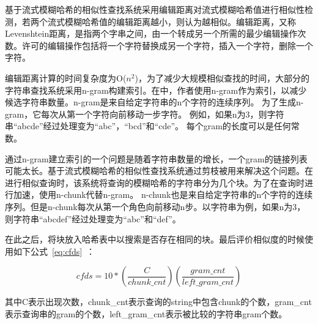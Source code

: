 基于流式模糊哈希的相似性查找系统采用编辑距离对流式模糊哈希值进行相似性检测，若两个流式模糊哈希值的编辑距离越小，则认为越相似。编辑距离，又称Levenshtein距离，是指两个字串之间，由一个转成另一个所需的最少编辑操作次数。许可的编辑操作包括将一个字符替换成另一个字符，插入一个字符，删除一个字符。

编辑距离计算的时间复杂度为O($n^2$)，为了减少大规模相似查找的时间，大部分的字符串查找系统采用n-gram构建索引。在\cite{Chen2008Efficient}中，作者使用n-gram作为索引，以减少候选字符串数量。n-gram是来自给定字符串的n个字符的连续序列。 为了生成n-gram，它每次从第一个字符向前移动一步字符。 例如，如果n为3，则字符串“abcde”经过处理变为“abc”，“bcd”和“cde”。 每个gram的长度可以是任何常数。

通过n-gram建立索引的一个问题是随着字符串数量的增长，一个gram的链接列表可能太长。基于流式模糊哈希的相似性查找系统通过剪枝被用来解决这个问题。在进行相似查询时，该系统将查询的模糊哈希的字符串分为几个块。为了在查询时进行加速，使用n-chunk代替n-gram。 n-chunk也是来自给定字符串的n个字符的连续序列。但是n-chunk每次从第一个角色向前移动n步。以字符串为例，如果n为3，则字符串“abcdef”经过处理变为“abc”和“def”。



在此之后，将块放入哈希表中以搜索是否存在相同的块。最后评价相似度的时候使用如下公式~\ref{eq:cfds}~：

\begin{equation} \label{eq:cfds}
cfds =  10*\left(\frac{C}{chunk\_cnt}\right)\left(\frac{gram\_cnt}{left\_gram\_cnt}\right)
\end{equation}

其中C表示出现次数，chunk\_cnt表示查询的string中包含chunk的个数，gram\_cnt表示查询串的gram的个数，left\_gram\_cnt表示被比较的字符串gram个数。

